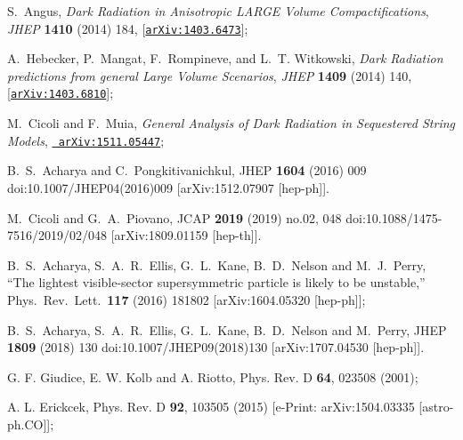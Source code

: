 \documentclass[12pt]{article}
\numberwithin{equation}{section}
\begin{document}
\begin{thebibliography}{99}
S.~Angus, {\it {Dark Radiation in Anisotropic LARGE Volume Compactifications}},
   {\em JHEP} {\bf 1410} (2014) 184,
  [\href{http://arxiv.org/abs/1403.6473}{{\tt arXiv:1403.6473}}];

A.~Hebecker, P.~Mangat, F.~Rompineve, and L.~T. Witkowski, {\it {Dark Radiation
  predictions from general Large Volume Scenarios}},  {\em JHEP} {\bf 1409}
  (2014) 140, [\href{http://arxiv.org/abs/1403.6810}{{\tt arXiv:1403.6810}}];

M.~Cicoli and F.~Muia, {\it {General Analysis of Dark Radiation in Sequestered
  String Models}},  \href{http://arxiv.org/abs/1511.05447}{{\tt
  arXiv:1511.05447}};

  B.~S.~Acharya and C.~Pongkitivanichkul,
  JHEP {\bf 1604} (2016) 009
  doi:10.1007/JHEP04(2016)009
  [arXiv:1512.07907 [hep-ph]].
   
 
  M.~Cicoli and G.~A.~Piovano,
  JCAP {\bf 2019} (2019) no.02,  048
  doi:10.1088/1475-7516/2019/02/048
  [arXiv:1809.01159 [hep-th]].
 
 
  B.~S.~Acharya, S.~A.~R.~Ellis, G.~L.~Kane, B.~D.~Nelson and M.~J.~Perry,
  ``The lightest visible-sector supersymmetric particle is likely to be unstable,''
  Phys.\ Rev.\ Lett.\  {\bf 117} (2016) 181802
  [arXiv:1604.05320 [hep-ph]];
   
  B.~S.~Acharya, S.~A.~R.~Ellis, G.~L.~Kane, B.~D.~Nelson and M.~Perry,
  JHEP {\bf 1809} (2018) 130
  doi:10.1007/JHEP09(2018)130
  [arXiv:1707.04530 [hep-ph]].
  
G. F. Giudice, E. W. Kolb and A. Riotto, Phys. Rev. D {\bf 64}, 023508 (2001);

A. L. Erickcek, Phys. Rev. D {\bf 92}, 103505 (2015) [e-Print: arXiv:1504.03335 [astro-ph.CO]];


\end{thebibliography}
\end{document}
